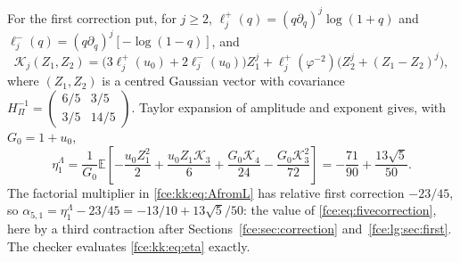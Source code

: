 \documentclass[11pt,a4paper]{article}
\numberwithin{equation}{section}
\theoremstyle{definition}\newtheorem{definition}[theorem]{Definition}
\theoremstyle{remark}\newtheorem{remark}[theorem]{Remark}
\newcommand{\Exp}{\mathbb E}
\begin{document}
For the first correction put, for $j\ge2$,
$\ell^+_j(q)=(q\partial_q)^j\log(1+q)$ and
$\ell^-_j(q)=(q\partial_q)^j[-\log(1-q)]$, and
\[
 \mathcal K_j(Z_1,Z_2)=\bigl(3\ell^+_j(u_0)+2\ell^-_j(u_0)\bigr)Z_1^j
 +\ell^+_j(\varphi^{-2})\bigl(Z_2^j+(Z_1-Z_2)^j\bigr),
\]
where $(Z_1,Z_2)$ is a centred Gaussian vector with covariance
$H_\Pi^{-1}=\begin{pmatrix}6/5&3/5\\3/5&14/5\end{pmatrix}$. Taylor expansion
of amplitude and exponent gives, with $G_0=1+u_0$,
\begin{equation}\label{fce:kk:eq:eta}
 \eta^\Lambda_1=\frac1{G_0}\Exp\left[
 -\frac{u_0Z_1^2}{2}+\frac{u_0Z_1\mathcal K_3}{6}
 +\frac{G_0\mathcal K_4}{24}-\frac{G_0\mathcal K_3^2}{72}\right]
 =-\frac{71}{90}+\frac{13\sqrt5}{50}.
\end{equation}
The factorial multiplier in \eqref{fce:kk:eq:AfromL} has relative first
correction $-23/45$, so $\alpha_{5,1}=\eta^\Lambda_1-23/45
=-13/10+13\sqrt5/50$: the value of \eqref{fce:eq:fivecorrection}, here by a
third contraction after Sections~\ref{fce:sec:correction}
and~\ref{fce:lg:sec:first}. The checker evaluates \eqref{fce:kk:eq:eta}
exactly.
\end{document}
